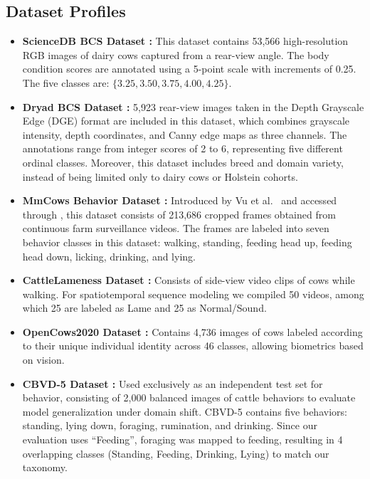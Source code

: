 \subsection{Dataset Profiles}
\begin{itemize}
    \item \textbf{ScienceDB BCS Dataset \cite{sciencedb2024}:} This dataset contains 53,566 high-resolution RGB images of dairy cows captured from a rear-view angle. The body condition scores are annotated using a 5-point scale with increments of 0.25. The five classes are: $\{3.25, 3.50, 3.75, 4.00, 4.25\}$.
    \item \textbf{Dryad BCS Dataset \cite{dryad2023bcs}:} 5,923 rear-view images taken in the Depth Grayscale Edge (DGE) format are included in this dataset, which combines grayscale intensity, depth coordinates, and Canny edge maps as three channels. The annotations range from integer scores of 2 to 6, representing five different ordinal classes. Moreover, this dataset includes breed and domain variety, instead of being limited only to dairy cows or Holstein cohorts.
    \item \textbf{MmCows Behavior Dataset \cite{vu2024mmcows}:} Introduced by Vu et al.~\cite{vu2024mmcows} and accessed through \cite{mmcows2024}, this dataset consists of 213,686 cropped frames obtained from continuous farm surveillance videos. The frames are labeled into seven behavior classes in this dataset: walking, standing, feeding head up, feeding head down, licking, drinking, and lying.
    \item \textbf{CattleLameness Dataset \cite{cattlelameness2024}:} Consists of side-view video clips of cows while walking. For spatiotemporal sequence modeling we compiled 50 videos, among which 25 are labeled as Lame and 25 as Normal/Sound.
    \item \textbf{OpenCows2020 Dataset \cite{opencows2020}:} Contains 4,736 images of cows labeled according to their unique individual identity across 46 classes, allowing biometrics based on vision.
    \item \textbf{CBVD-5 Dataset \cite{li2024cbvd5}:} Used exclusively as an independent test set for behavior, consisting of 2,000 balanced images of cattle behaviors to evaluate model generalization under domain shift. CBVD-5 contains five behaviors: standing, lying down, foraging, rumination, and drinking. Since our evaluation uses ``Feeding'', foraging was mapped to feeding, resulting in 4 overlapping classes (Standing, Feeding, Drinking, Lying) to match our taxonomy.
\end{itemize}

